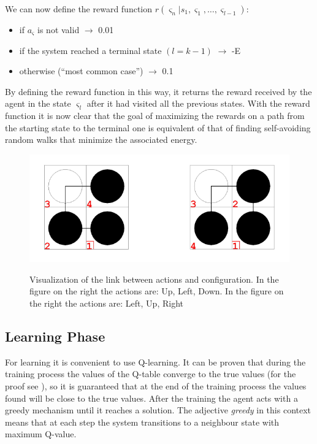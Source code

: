 We can now define the reward function $r(\varsigma_{n}|s_{1}, \varsigma_{1}, \ldots, \varsigma_{l-1})$:
\begin{itemize}
    \item if $a_{\varsigma}$ is not valid $\rightarrow$ 0.01
    \item if the system reached a terminal state $(l = k-1)$ $\rightarrow$ -E
    \item otherwise (``most common case'') $\rightarrow$ 0.1
\end{itemize}
By defining the reward function in this way, it returns the reward received by the agent in the state $\varsigma_{l}$ after it had visited all the previous states.
With the reward function it is now clear that the goal of maximizing the rewards on a path from the starting state to the terminal one is equivalent of that of finding self-avoiding random walks that minimize the associated energy.

\begin{figure}[H]
    \centering
    \includegraphics[width=.75\textwidth]{img/rl1.png}
    \caption{Visualization of the link between actions and configuration. In the figure on the right the actions are: Up, Left, Down. In the figure on the right the actions are: Left, Up, Right} \cite{czibula2011reinforcement}
    \label{fig:rl0}
\end{figure}
\subsection{Learning Phase}

For learning it is convenient to use Q-learning. It can be proven that during the training process the values of the Q-table converge to the true values (for the proof see \cite{czibula2011reinforcement}), so it is guaranteed that at the end of the training process the values found will be close to the true values.
After the training the agent acts with a greedy mechanism until it reaches a solution. The adjective \emph{greedy} in this context means that at each step the system transitions to a neighbour state with maximum Q-value.

